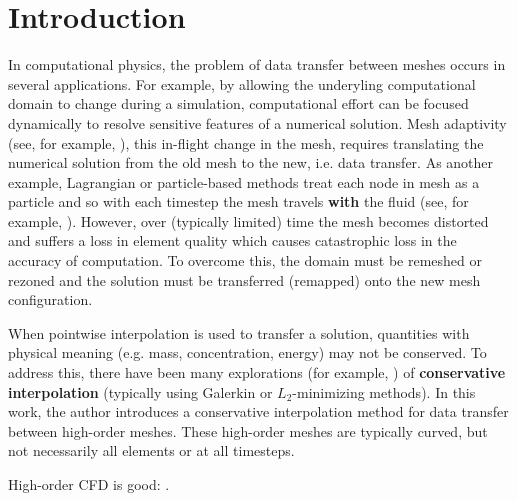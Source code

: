 \chapter{Introduction}

In computational physics, the problem of data transfer between meshes
occurs in several applications. For example, by allowing the underyling
computational domain to change during a simulation, computational
effort can be focused dynamically to resolve sensitive features
of a numerical solution. Mesh adaptivity (see, for example,
\cite{Dukowicz1987, Babuska1978}), this in-flight change in the mesh,
requires translating the numerical solution from the old mesh to the new,
i.e. data transfer. As another example, Lagrangian or particle-based methods
treat each node in mesh as a particle and so with each timestep the mesh
travels \textbf{with} the fluid (see, for example, \cite{Hirt1974}).
However, over (typically limited) time the mesh
becomes distorted and suffers a loss in element quality which causes
catastrophic loss in the accuracy of computation. To overcome this, the
domain must be remeshed or rezoned and the solution must be
transferred (remapped) onto the new mesh configuration.

When pointwise interpolation is used to transfer a solution, quantities with
physical meaning (e.g. mass, concentration, energy) may not be conserved.
To address this, there have been many explorations (for example,
\cite{Jiao2004, Farrell2009, Farrell2011}) of
\textbf{conservative interpolation} (typically using Galerkin or
\(L_2\)-minimizing methods). In this work, the author introduces a
conservative interpolation method for data transfer between high-order
meshes. These high-order meshes are typically curved, but not necessarily
all elements or at all timesteps.

High-order CFD is good: \cite{Wang2013}.



